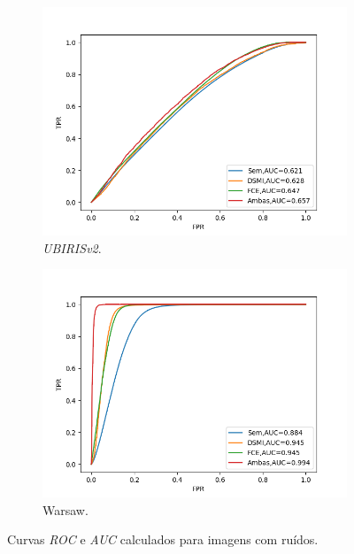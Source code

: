 \begin{figure}[h!]
\medskip
\begin{subfigure}{0.35\textwidth}
  \includegraphics[width=\linewidth]{img/Resultados/ubirisv2_inter_distortion_auc.png}
  \caption{\textit{UBIRISv2}.}
\end{subfigure}\hfil %
\begin{subfigure}{0.35\textwidth}
  \includegraphics[width=\linewidth]{img/Resultados/warsaw_inter_distortion_auc.png}
  \caption{{\acrshort{Warsaw}}.}
\end{subfigure}\hfil %
\caption{Curvas \textit{\acrshort{ROC}} e \textit{\acrshort{AUC}} calculados para imagens com ruídos.}
\label{fig:experimentos:roc_comruidos}
\end{figure}


